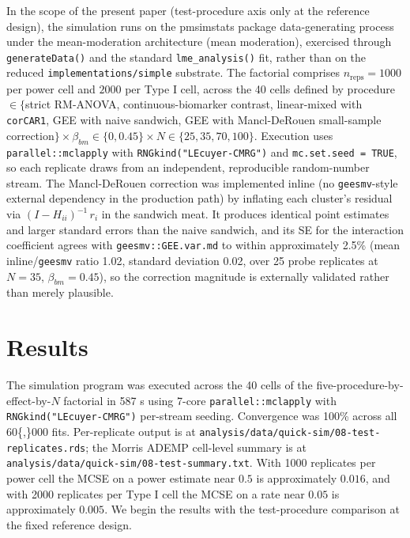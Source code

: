 \documentclass[
  11pt,
]{article}
\begin{document}
In the scope of the present paper (test-procedure axis only at
the reference design), the simulation runs on the pmsimstats
package data-generating process under the mean-moderation architecture (mean
moderation), exercised through \texttt{generateData()} and the standard
\texttt{lme\_analysis()} fit, rather than on the reduced
\texttt{implementations/simple} substrate. The factorial comprises
\(n_{\text{reps}} = 1000\) per power cell and \(2000\) per Type I
cell, across the 40 cells defined by procedure \(\in \{\)strict
RM-ANOVA, continuous-biomarker contrast, linear-mixed with
\texttt{corCAR1}, GEE with naive sandwich, GEE with Mancl-DeRouen
small-sample correction\(\} \times \beta_{bm} \in \{0, 0.45\} \times
N \in \{25, 35, 70, 100\}\). Execution uses
\texttt{parallel::mclapply} with \texttt{RNGkind("L\textquotesingle{}Ecuyer-CMRG")} and
\texttt{mc.set.seed\ =\ TRUE}, so each replicate draws from an
independent, reproducible random-number stream. The
Mancl-DeRouen correction was implemented inline (no
\texttt{geesmv}-style external dependency in the production path) by
inflating each cluster's residual via \((I - H_{ii})^{-1}\,r_i\)
in the sandwich meat. It produces identical point estimates and
larger standard errors than the naive sandwich, and its SE for
the interaction coefficient agrees with \texttt{geesmv::GEE.var.md} to
within approximately 2.5\% (mean inline/\texttt{geesmv} ratio 1.02,
standard deviation 0.02, over 25 probe replicates at
\(N = 35\), \(\beta_{bm} = 0.45\)), so the correction magnitude is
externally validated rather than merely plausible.

\section{Results}\label{results}

The simulation program was executed across the 40 cells of the
five-procedure-by-effect-by-\(N\) factorial in 587 s using 7-core
\texttt{parallel::mclapply} with \texttt{RNGkind("L\textquotesingle{}Ecuyer-CMRG")} per-stream
seeding. Convergence was 100\% across all 60\{,\}000 fits.
Per-replicate output is at
\texttt{analysis/data/quick-sim/08-test-replicates.rds}; the Morris
ADEMP cell-level summary is at
\texttt{analysis/data/quick-sim/08-test-summary.txt}. With 1000
replicates per power cell the MCSE on a power estimate near
\(0.5\) is approximately \(0.016\), and with 2000 replicates per
Type I cell the MCSE on a rate near \(0.05\) is approximately
\(0.005\). We begin the results with the test-procedure comparison
at the fixed reference design.
\end{document}
